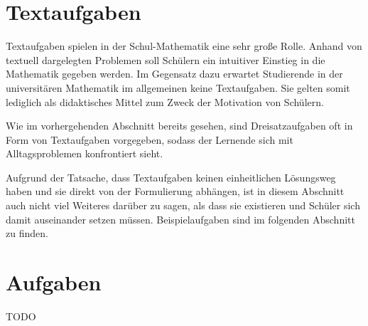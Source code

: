 \section{Textaufgaben}

Textaufgaben spielen in der Schul-Mathematik eine sehr große Rolle. Anhand von textuell dargelegten Problemen soll Schülern ein intuitiver Einstieg in die Mathematik gegeben werden. Im Gegensatz dazu erwartet Studierende in der universitären Mathematik im allgemeinen keine Textaufgaben. Sie gelten somit lediglich als didaktisches Mittel zum Zweck der Motivation von Schülern. 

Wie im vorhergehenden Abschnitt bereits gesehen, sind Dreisatzaufgaben oft in Form von Textaufgaben vorgegeben, sodass der Lernende sich mit Alltagsproblemen konfrontiert sieht. 

Aufgrund der Tatsache, dass Textaufgaben keinen einheitlichen Lösungsweg haben und sie direkt von der Formulierung abhängen, ist in diesem Abschnitt auch nicht viel Weiteres darüber zu sagen, als dass sie existieren und Schüler sich damit auseinander setzen müssen. Beispielaufgaben sind im folgenden Abschnitt zu finden.

\section{Aufgaben}

TODO